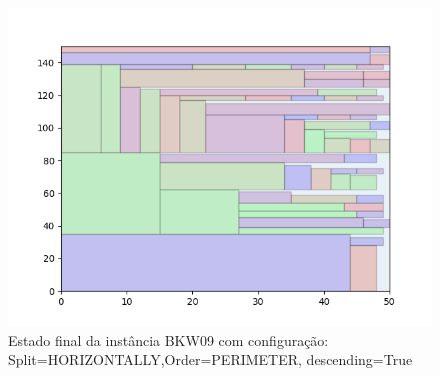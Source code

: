 \begin{figure}[H]
    \centering
    \caption[]{Estado final da instância BKW09 com configuração: Split=HORIZONTALLY,Order=PERIMETER, descending=True}
    \label{fig:bkw09-horizontally-perimeter-true}
    \includegraphics[scale=0.5]{output/figures/bkw/bkw09/horizontally/perimeter/true/000}
\end{figure}